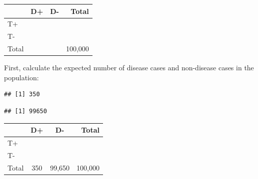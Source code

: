 \begin{center}
\begin{tabular}{|l|c|c|r|}
\hline 
& D+ & D- & Total\\ 
\hline
T+ & & & \\ 
\hline
T- & & & \\ 
\hline 
Total & & & 100,000 \\ 
\hline 
\end{tabular} 
\end{center} 

First, calculate the expected number of disease cases and non-disease cases in the population:
\begin{knitrout}
\color{fgcolor}\begin{kframe}
\begin{alltt}
 \hlkwb{=} 
 \hlkwb{=}  \hlopt{*} 
\end{alltt}
\begin{verbatim}
## [1] 350
\end{verbatim}
\begin{alltt}
 \hlkwb{=} \hlstd{(} \hlopt{-}  \hlopt{*} 
\end{alltt}
\begin{verbatim}
## [1] 99650
\end{verbatim}
\end{kframe}
\end{knitrout}

\begin{center}
\begin{tabular}{|l|c|c|r|}
\hline 
& D+ & D- & Total\\ 
\hline
T+ & & & \\ 
\hline
T- & & & \\ 
\hline 
Total & 350 & 99,650 & 100,000 \\ 
\hline 
\end{tabular} 
\end{center}

